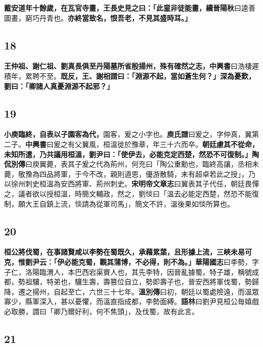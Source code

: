 \textbf{戴安道年十餘歲，在瓦官寺畫，王長史見之曰：「此童非徒能畫，}{\footnotesize \textbf{續晉陽秋}曰逵善圖畫，窮巧丹青也。}\textbf{亦終當致名，恨吾老，不見其盛時耳。」}

\subsection*{18}

\textbf{王仲祖、謝仁祖、劉真長俱至丹陽墓所省殷揚州，殊有確然之志，}{\footnotesize \textbf{中興書}曰浩棲遲積年，累聘不至。}\textbf{既反，王、謝相謂曰：「淵源不起，當如蒼生何？」深為憂歎，劉曰：「卿諸人真憂淵源不起邪？」}

\subsection*{19}

\textbf{小庾臨終，自表以子園客為代，}{\footnotesize 園客，爰之小字也。\textbf{庾氏譜}曰爰之，字仲真，翼第二子。\textbf{中興書}曰爰之有父翼風，桓溫徙於豫章，年三十六而卒。}\textbf{朝廷慮其不從命，未知所遣，乃共議用桓溫，劉尹曰：「使伊去，必能克定西楚，然恐不可復制。」}{\footnotesize \textbf{陶侃別傳}曰庾翼薨，表其子爰之代為荊州，何充曰「陶公重勳也，臨終高讓，丞相未薨，敬豫為四品將軍，于今不改，親則道恩，優游散騎，未有超卓若此之授」，乃以徐州刺史桓溫為安西將軍、荊州刺史。\textbf{宋明帝文章志}曰翼表其子代任，朝廷畏憚之，議者欲以授桓溫，時簡文輔政，然之，劉惔曰「溫去必能定西楚，然恐不能復制，願大王自鎮上流，惔請為從軍司馬」，簡文不許，溫後果如惔所算也。}

\subsection*{20}

\textbf{桓公將伐蜀，在事諸賢咸以李勢在蜀既久，承藉累葉，且形據上流，三峽未易可克，惟劉尹云：「伊必能克蜀，觀其蒲博，不必得，則不為。」}{\footnotesize \textbf{華陽國志}曰李勢，字子仁，洛陽臨渭人，本巴西宕渠賨人也，其先李特，因晉亂據蜀，特子雄，稱號成都，勢祖驤，特弟也，驤生壽，壽篡位自立，勢即壽子也，晉安西將軍伐蜀，勢歸降，遷之揚州，自起至亡，六世三十七年。\textbf{溫別傳}曰初，朝廷以蜀處險遠，而溫眾寡少，縣軍深入，甚以憂懼，而溫直指成都，李勢面縛。\textbf{語林}曰劉尹見桓公毎嬉戲必取勝，謂曰「卿乃爾好利，何不焦頭」，及伐蜀，故有此言。}

\subsection*{21}

